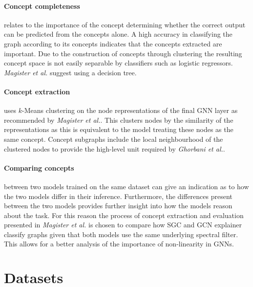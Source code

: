\paragraph{Concept completeness}
relates to the importance of the concept determining whether the correct output can be predicted from the concepts alone.
A high accuracy in classifying the graph according to its concepts indicates that the concepts extracted are important.
Due to the construction of concepts through clustering the resulting concept space is not easily separable by classifiers such as logistic regressors.
\textit{Magister et al.}\cite{magister2021gcexplainer} suggest using a decision tree\cite{kazhdan2020now}.



\paragraph{Concept extraction}
uses $k$-Means clustering on the node representations of the final GNN layer as recommended by \textit{Magister et al.}\cite{magister2021gcexplainer}.
This clusters nodes by the similarity of the representations as this is equivalent to the model treating these nodes as the same concept.
Concept subgraphs include the local neighbourhood of the clustered nodes to provide the high-level unit required by \textit{Ghorbani et al.}\cite{ghorbani2019towards}.

\paragraph{Comparing concepts} between two models trained on the same dataset can give an indication as to how the two models differ in their inference.
Furthermore, the differences present between the two models provides further insight into how the models reason about the task.
For this reason the process of concept extraction and evaluation presented in \textit{Magister et al.}\cite{magister2021gcexplainer} is chosen to compare how SGC and GCN explainer classify graphs given that both models use the same underlying spectral filter.
This allows for a better analysis of the importance of non-linearity in GNNs.  

\section{Datasets}
\label{sec:datasets-theory}

